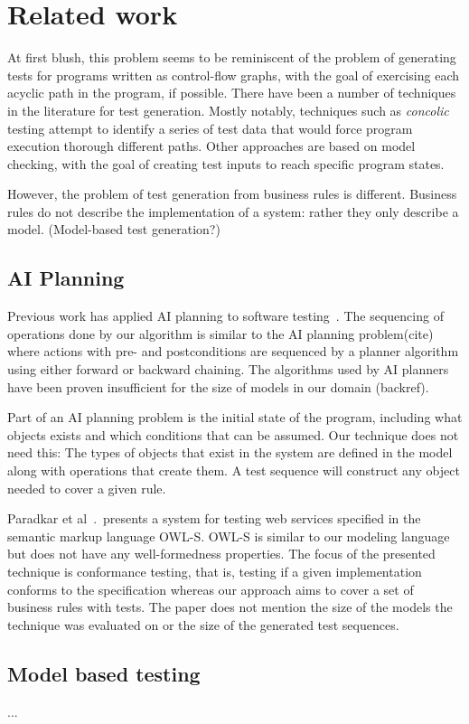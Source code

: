 \section{Related work}

At first blush, this problem seems to be reminiscent of the problem of generating tests for programs 
written as control-flow graphs, with the goal of exercising each acyclic path in the program, if
possible.  There have been a number of techniques in the literature for test generation. Mostly
notably, techniques such as \textit{concolic} testing attempt to identify a series of test data 
that would force program execution thorough different paths.  Other approaches are based on model
checking, with the goal of creating test inputs to reach specific program states.

However, the problem of test generation from business rules is different.  Business rules do not
describe the implementation of a system: rather they only describe a model.  (Model-based test 
generation?)

\subsection{AI Planning}

Previous work has applied AI planning to software testing~\cite{Scheetz99ai,Howe97testcase}. The sequencing of operations done by our algorithm is similar to the AI planning problem(cite) where actions with pre- and postconditions are sequenced by a planner algorithm using either forward or backward chaining. The algorithms used by AI planners have been proven insufficient for the size of models in our domain (backref). 

Part of an AI planning problem is the initial state of the program, including what objects exists and which conditions that can be assumed. Our technique does not need this: The types of objects that exist in the system are defined in the model along with operations that create them. A test sequence will construct any object needed to cover a given rule. 

Paradkar et al~\cite{conf/icws/ParadkarSWJOSL07}.\ presents a system for testing web services specified in the semantic markup language OWL-S. OWL-S is similar to our modeling language but does not have any well-formedness properties. The focus of the presented technique is conformance testing, that is, testing if a given implementation conforms to the specification whereas our approach aims to cover a set of business rules with tests. The paper does not mention the size of the models the technique was evaluated on or the size of the generated test sequences.


\subsection{Model based testing}

...